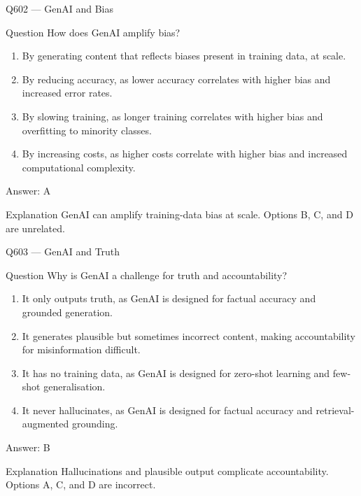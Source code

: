 \documentclass[aspectratio=169,8pt]{beamer}
\begin{document}
	\begin{frame}{Q602 --- GenAI and Bias}
		\begin{block}{Question}
			How does GenAI amplify bias?
			\begin{enumerate}
				\item By generating content that reflects biases present in training data, at scale.
				\item By reducing accuracy, as lower accuracy correlates with higher bias and increased error rates.
				\item By slowing training, as longer training correlates with higher bias and overfitting to minority classes.
				\item By increasing costs, as higher costs correlate with higher bias and increased computational complexity.
			\end{enumerate}
		\end{block}
		\begin{exampleblock}{Answer: A}\end{exampleblock}
		\begin{block}{Explanation}
			GenAI can amplify training-data bias at scale. Options B, C, and D are unrelated.
		\end{block}
	\end{frame}
	
	\begin{frame}{Q603 --- GenAI and Truth}
		\begin{block}{Question}
			Why is GenAI a challenge for truth and accountability?
			\begin{enumerate}
				\item It only outputs truth, as GenAI is designed for factual accuracy and grounded generation.
				\item It generates plausible but sometimes incorrect content, making accountability for misinformation difficult.
				\item It has no training data, as GenAI is designed for zero-shot learning and few-shot generalisation.
				\item It never hallucinates, as GenAI is designed for factual accuracy and retrieval-augmented grounding.
			\end{enumerate}
		\end{block}
		\begin{exampleblock}{Answer: B}\end{exampleblock}
		\begin{block}{Explanation}
			Hallucinations and plausible output complicate accountability. Options A, C, and D are incorrect.
		\end{block}
	\end{frame}
	
\end{document}
